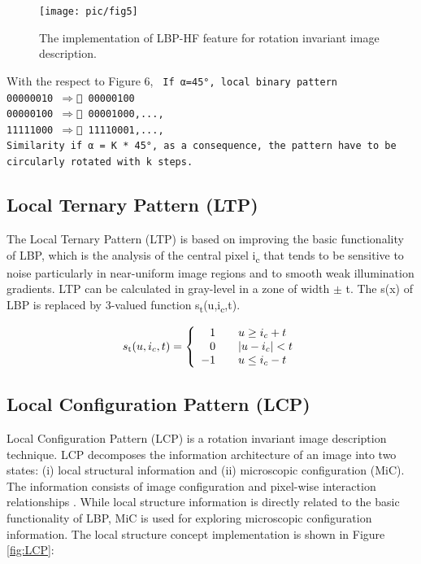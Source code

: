 \documentclass[review]{elsarticle}
\begin{document}
\begin{figure}[h]
	\centering
	\texttt{[image: pic/fig5]}
	\caption{The implementation of LBP-HF feature for rotation invariant image description.}
	\label{fig:LBP-HF}
\end{figure}

With the respect to Figure 6, 
\texttt{\noindent
	\newline\noindent
	If α=\ang{45}, local binary pattern\\
	\phantom{x}\hspace{10ex}00000010 $\Rightarrow$  00000100 \\
	\phantom{x}\hspace{10ex}00000100 $\Rightarrow$  00001000,...,\\
	\phantom{x}\hspace{10ex}11111000 $\Rightarrow$  11110001,...,\\
	Similarity if α = K * \ang{45}, as a consequence, the pattern have to be circularly rotated with k steps. \\
}


\subsection{Local Ternary Pattern (LTP)}
\label{subsec:LTP}
The Local Ternary Pattern (LTP) is based on improving the basic functionality of LBP, which is the analysis of the central pixel i\textsubscript{c} that tends to be sensitive to noise particularly in near-uniform image regions and to smooth weak illumination gradients. LTP can be calculated in gray-level in a zone of width $\pm$ t. The s(x) of LBP is replaced by 3-valued function s\textsubscript{t}(u,i\textsubscript{c},t).
 
\begin{equation}
s\textsubscript{t}(u,i_c,t) = \left\{ \begin{array}{rcl}
1 & 
& u\geq i_c+t \\ 0 &  & |u - i_c| <t \\
-1 & & u \leq i_c -t

\end{array}\right.
\end{equation}

\subsection{Local Configuration Pattern (LCP)}
\label{subsec:LCP}
Local Configuration Pattern (LCP) is a rotation invariant image description technique. LCP decomposes the information architecture of an image into two states: (i) local structural information and (ii) microscopic configuration (MiC). The information consists of image configuration and pixel-wise interaction relationships \cite{Guo2011}. While local structure information is directly related to the basic functionality of LBP, MiC is used for exploring microscopic configuration information. The local structure concept implementation is shown in Figure \ref{fig:LCP}:
\end{document}
